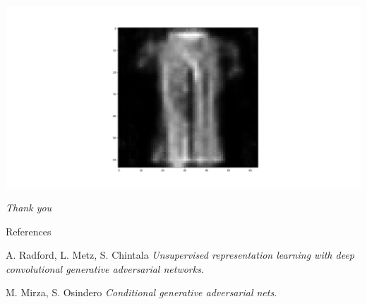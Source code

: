 \documentclass{beamer}
\begin{document}
\begin{frame}
    \centering
    \includegraphics[scale=0.2]{images/shirtpants-weighted.png}
\end{frame}

\begin{frame}
    \centering
    \huge{\textit{Thank you}}
\end{frame}


\begin{frame}{References}
    \begin{thebibliography}{}

        A. Radford, L. Metz, S. Chintala
        \newblock \emph{Unsupervised representation learning with deep convolutional generative adversarial networks}.

        M. Mirza, S. Osindero
        \newblock \emph{Conditional generative adversarial nets}.

    \end{thebibliography}
\end{frame}
\end{document}
